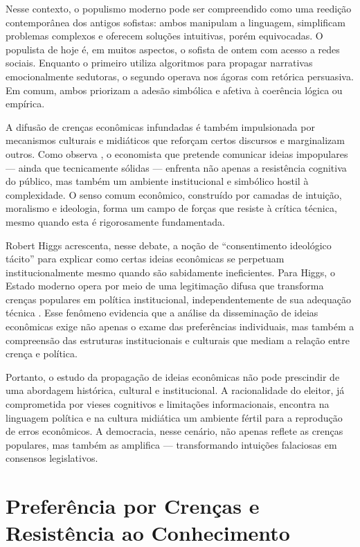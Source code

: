 Nesse contexto, o populismo moderno pode ser compreendido como uma reedição contemporânea dos antigos sofistas: ambos manipulam a linguagem, simplificam problemas complexos e oferecem soluções intuitivas, porém equivocadas. O populista de hoje é, em muitos aspectos, o sofista de ontem com acesso a redes sociais. Enquanto o primeiro utiliza algoritmos para propagar narrativas emocionalmente sedutoras, o segundo operava nos ágoras com retórica persuasiva. Em comum, ambos priorizam a adesão simbólica e afetiva à coerência lógica ou empírica.

A difusão de crenças econômicas infundadas é também impulsionada por mecanismos culturais e midiáticos que reforçam certos discursos e marginalizam outros. Como observa , o economista que pretende comunicar ideias impopulares — ainda que tecnicamente sólidas — enfrenta não apenas a resistência cognitiva do público, mas também um ambiente institucional e simbólico hostil à complexidade. O senso comum econômico, construído por camadas de intuição, moralismo e ideologia, forma um campo de forças que resiste à crítica técnica, mesmo quando esta é rigorosamente fundamentada.

Robert Higgs acrescenta, nesse debate, a noção de ``consentimento ideológico tácito'' para explicar como certas ideias econômicas se perpetuam institucionalmente mesmo quando são sabidamente ineficientes. Para Higgs, o Estado moderno opera por meio de uma legitimação difusa que transforma crenças populares em política institucional, independentemente de sua adequação técnica \cite{higgs1987crisis}. Esse fenômeno evidencia que a análise da disseminação de ideias econômicas exige não apenas o exame das preferências individuais, mas também a compreensão das estruturas institucionais e culturais que mediam a relação entre crença e política.

Portanto, o estudo da propagação de ideias econômicas não pode prescindir de uma abordagem histórica, cultural e institucional. A racionalidade do eleitor, já comprometida por vieses cognitivos e limitações informacionais, encontra na linguagem política e na cultura midiática um ambiente fértil para a reprodução de erros econômicos. A democracia, nesse cenário, não apenas reflete as crenças populares, mas também as amplifica — transformando intuições falaciosas em consensos legislativos.

\section{Preferência por Crenças e Resistência ao Conhecimento}

